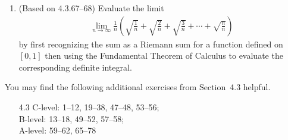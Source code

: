 \documentclass{article}
\newcommand{\ds}{\displaystyle}
\begin{document}
\begin{enumerate}
\item (Based on 4.3.67--68) %
  Evaluate the limit
  \begin{align*}
    \lim_{n\to\infty} \frac{1}{n} \left( \sqrt{\frac{1}{n}} + 
      \sqrt{\frac{2}{n}} + \sqrt{\frac{3}{n}} + \cdots + \sqrt{\frac{n}{n}}
    \right)
  \end{align*}
  by first recognizing the sum as a Riemann sum for a function defined on
  $[0,1]$ then using the Fundamental Theorem of Calculus to evaluate the 
  corresponding definite integral.
\end{enumerate}

\noindent
You may find the following additional exercises from Section~4.3 helpful.
\begin{itemize}
\item[4.3]
  C-level: 1--12, 19--38, 47--48, 53--56; \\
  B-level: 13--18, 49--52, 57--58; \\
  A-level: 59--62, 65--78
\end{itemize}
\end{document}
